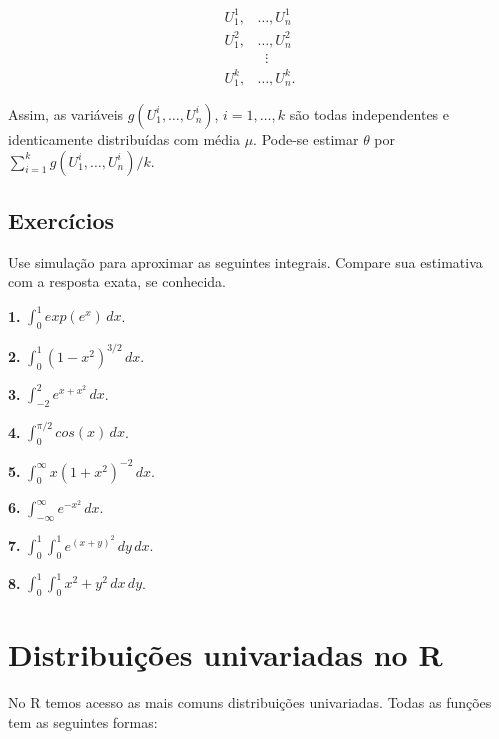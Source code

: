 \documentclass[
]{book}
\begin{document}
\begin{align*}
U_{1}^{1},&\ldots,U_{n}^{1} \\
U_{1}^{2},&\ldots,U_{n}^{2} \\
& \;\;\vdots \\
U_{1}^{k},&\ldots,U_{n}^{k}.
\end{align*}

Assim, as variáveis \(g(U_{1}^{i},\ldots, U_{n}^{i})\), \(i=1,\ldots,k\) são
todas independentes e identicamente distribuídas com média \(\mu\).
Pode-se estimar \(\theta\) por
\(\sum_{i=1}^{k}g(U_{1}^{i},\ldots, U_{n}^{i})/k\).

\section{Exercícios}\label{exercuxedcios-31}

Use simulação para aproximar as seguintes integrais. Compare sua
estimativa com a resposta exata, se conhecida.

\textbf{1.} \(\int_{0}^{1}exp(e^x)\, dx\).

\textbf{2.} \(\int_{0}^{1}(1-x^2)^{3/2}\, dx\).

\textbf{3.} \(\int_{-2}^{2}e^{x+x^2}\, dx\).

\textbf{4.} \(\int_{0}^{\pi/2} cos(x)\, dx\).

\textbf{5.} \(\int_{0}^{\infty}x(1+x^2)^{-2}\, dx\).

\textbf{6.} \(\int_{-\infty}^{\infty}e^{-x^2}\, dx\).

\textbf{7.} \(\int_{0}^{1}\int_{0}^{1}e^{(x+y)^2}\,dy\,dx\).

\textbf{8.} \(\int_0^1 \int_0^1 x^2 + y^2 \, dx \, dy\).

\chapter{Distribuições univariadas no R}\label{distribuiuxe7uxf5es-univariadas-no-r}

No R temos acesso as mais comuns distribuições univariadas. Todas as
funções tem as seguintes formas:
\end{document}
